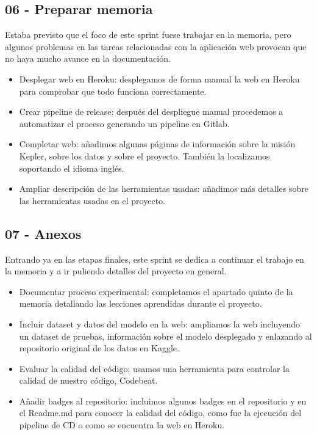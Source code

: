 \subsection{06 - Preparar memoria \newline
[05/05/2020 - 18/05/2020]}

Estaba previsto que el foco de este sprint fuese trabajar en la memoria, pero algunos problemas en las tareas relacionadas con la aplicación web provocan que no haya mucho avance en la documentación.

\begin{itemize}
    \item Desplegar web en Heroku: desplegamos de forma manual la web en Heroku para comprobar que todo funciona correctamente.
    \item Crear pipeline de release: después del despliegue manual procedemos a automatizar el proceso generando un pipeline en Gitlab.
    \item Completar web: añadimos algunas páginas de información sobre la misión Kepler, sobre los datos y sobre el proyecto. También la localizamos soportando el idioma inglés.
    \item Ampliar descripción de las herramientas usadas: añadimos más detalles sobre las herramientas usadas en el proyecto.
\end{itemize}


\subsection{07 - Anexos 
\newline[19/05/2020 – 31/05/2020]}

Entrando ya en las etapas finales, este sprint se dedica a continuar el trabajo en la memoria y a ir puliendo detalles del proyecto en general.

\begin{itemize}
    \item Documentar proceso experimental: completamos el apartado quinto de la memoria detallando las lecciones aprendidas durante el proyecto.
    \item Incluir dataset y datos del modelo en la web: ampliamos la web incluyendo un dataset de pruebas, información sobre el modelo desplegado y enlazando al repositorio original de los datos en Kaggle.
    \item Evaluar la calidad del código: usamos una herramienta para controlar la calidad de nuestro código, Codebeat.
    \item Añadir badges al repositorio: incluimos algunos badges en el repositorio y en el Readme.md para conocer la calidad del código, como fue la ejecución del pipeline de CD o como se encuentra la web en Heroku.    
\end{itemize}

